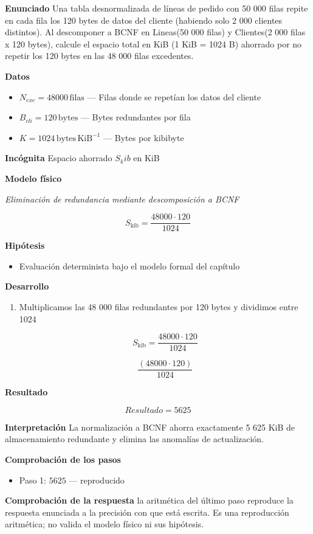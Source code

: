 \documentclass{book}
\begin{document}
\begin{tcolorbox}[title={Problema resuelto}, studiumworked, breakable]

\noindent\textbf{Enunciado}
Una tabla desnormalizada de líneas de pedido con 50 000 filas repite en cada fila los 120 bytes de datos del cliente (habiendo solo 2 000 clientes distintos). Al descomponer a BCNF en Lineas(50 000 filas) y Clientes(2 000 filas x 120 bytes), calcule el espacio total en KiB (1 KiB = 1024 B) ahorrado por no repetir los 120 bytes en las 48 000 filas excedentes.

\noindent\textbf{Datos}
\begin{itemize}
\item $N_{exc} = 48000\,\mathrm{filas}$ — Filas donde se repetían los datos del cliente
\item $B_{cli} = 120\,\mathrm{bytes}$ — Bytes redundantes por fila
\item $K = 1024\,\mathrm{bytes}\,\mathrm{KiB}^{-1}$ — Bytes por kibibyte
\end{itemize}

\noindent\textbf{Incógnita}
Espacio ahorrado \(S_kib\) en KiB

\noindent\textbf{Modelo físico}

\noindent\textit{Eliminación de redundancia mediante descomposición a BCNF}

\[
S_{\text{kib}} = \frac{48000 \cdot 120}{1024}
\]

\noindent\textbf{Hipótesis}
\begin{itemize}
\item Evaluación determinista bajo el modelo formal del capítulo
\end{itemize}

\noindent\textbf{Desarrollo}
\begin{enumerate}
\item
Multiplicamos las 48 000 filas redundantes por 120 bytes y dividimos entre 1024

\[
S_{\text{kib}} = \frac{48000 \cdot 120}{1024}
\]

\[
\frac{\left(48000\cdot 120\right)}{1024}
\]
\end{enumerate}

\noindent\textbf{Resultado}

\[
Resultado = 5625
\]

\noindent\textbf{Interpretación}
La normalización a BCNF ahorra exactamente 5 625 KiB de almacenamiento redundante y elimina las anomalías de actualización.

\noindent\textbf{Comprobación de los pasos}
\begin{itemize}
\item Paso 1: $5625$ — reproducido
\end{itemize}

\noindent\textbf{Comprobación de la respuesta} la aritmética del último paso reproduce la respuesta enunciada a la precisión con que está escrita. Es una reproducción aritmética; no valida el modelo físico ni sus hipótesis.
\end{tcolorbox}
\end{document}
